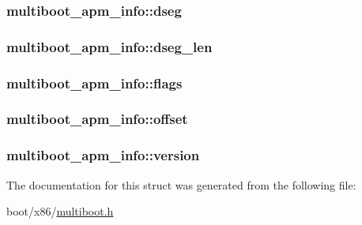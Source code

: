 \subsubsection[{dseg}]{ multiboot\+\_\+apm\+\_\+info\+::dseg}\label{structmultiboot__apm__info_a98cd7da8760cf5d49ba55e1f9e76c6d4}
\hypertarget{structmultiboot__apm__info_afee11d31183fe424af90546b10c9fac2}{}
\subsubsection[{dseg\+\_\+len}]{ multiboot\+\_\+apm\+\_\+info\+::dseg\+\_\+len}\label{structmultiboot__apm__info_afee11d31183fe424af90546b10c9fac2}
\hypertarget{structmultiboot__apm__info_a55fb7837ae61f63d0310b65767a2505c}{}
\subsubsection[{flags}]{ multiboot\+\_\+apm\+\_\+info\+::flags}\label{structmultiboot__apm__info_a55fb7837ae61f63d0310b65767a2505c}
\hypertarget{structmultiboot__apm__info_a97958b174fe0234cafab9019eb009b91}{}
\subsubsection[{offset}]{ multiboot\+\_\+apm\+\_\+info\+::offset}\label{structmultiboot__apm__info_a97958b174fe0234cafab9019eb009b91}
\hypertarget{structmultiboot__apm__info_ab06d9309bdc00fa4a8c37fdab639beb5}{}
\subsubsection[{version}]{ multiboot\+\_\+apm\+\_\+info\+::version}\label{structmultiboot__apm__info_ab06d9309bdc00fa4a8c37fdab639beb5}


The documentation for this struct was generated from the following file\+:\begin{DoxyCompactItemize}
\item 
boot/x86/\hyperlink{multiboot_8h}{multiboot.\+h}\end{DoxyCompactItemize}
